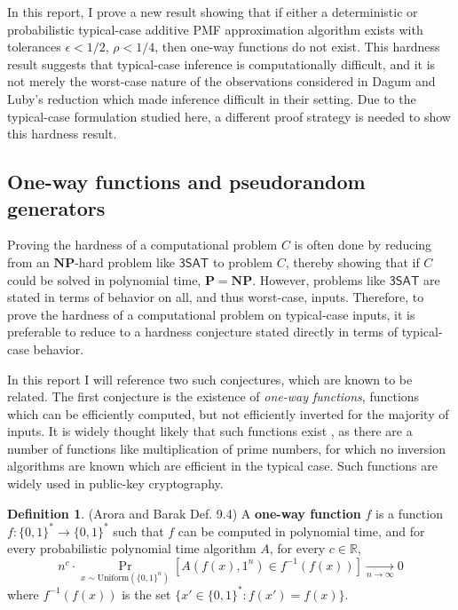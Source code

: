 \documentclass{article}
\renewcommand{\P}{\mathbf{P}}
\newcommand{\NP}{\mathbf{NP}}
\theoremstyle{definition}
\newtheorem{defn}{Definition}
\theoremstyle{remark}
\begin{document}
In this report, I prove a new result showing that if either a deterministic or probabilistic typical-case additive PMF approximation algorithm exists with tolerances $\epsilon < 1/2$, $\rho < 1/4$, then one-way functions do not exist.
This hardness result suggests that typical-case inference is computationally difficult, and it is not merely the worst-case nature of the observations considered in Dagum and Luby's reduction which made inference difficult in their setting.
Due to the typical-case formulation studied here, a different proof strategy is needed to show this hardness result.

\subsection{One-way functions and pseudorandom generators}
Proving the hardness of a computational problem $C$ is often done by reducing from an $\NP$-hard problem like $\mathsf{3SAT}$ to problem $C$, thereby showing that if $C$ could be solved in polynomial time, $\P = \NP$.
However, problems like $\mathsf{3SAT}$ are stated in terms of behavior on all, and thus worst-case, inputs.
Therefore, to prove the hardness of a computational problem on typical-case inputs, it is preferable to reduce to a hardness conjecture stated directly in terms of typical-case behavior.

In this report I will reference two such conjectures, which are known to be related.
The first conjecture is the existence of \textit{one-way functions}, functions which can be efficiently computed, but not efficiently inverted for the majority of inputs.
It is widely thought likely that such functions exist \cite{arora2009computational}, as there are a number of functions like multiplication of prime numbers, for which no inversion algorithms are known which are efficient in the typical case.
Such functions are widely used in public-key cryptography.

\begin{defn}{(Arora and Barak Def. 9.4)} \label{def:oneway}
A \textbf{one-way function} $f$ is a function $f : \{0, 1\}^* \to \{0, 1\}^*$ such that $f$ can be computed in polynomial time, and for every probabilistic polynomial time algorithm $A$, for every $c \in \mathbb{R}$,
\begin{equation} \label{eq:oneway}
n^c \cdot \Pr_{x \sim \text{Uniform}(\{0, 1\}^n)}[A(f(x), 1^n) \in f^{-1}(f(x))] \underset{n \to \infty}{\to} 0
\end{equation}
where $f^{-1}(f(x))$ is the set $\{x' \in \{0, 1\}^* : f(x') = f(x)\}$.
\end{defn}
\end{document}
